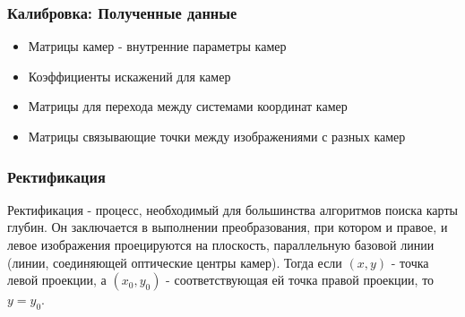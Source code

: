 \documentclass{beamer}
\begin{document}
		\begin{frame}
			\frametitle{Калибровка: Полученные данные}
			
			\begin{itemize}
				\item Матрицы камер - внутренние параметры камер
				\item Коэффициенты искажений для камер
				\item Матрицы для перехода между системами координат камер
				\item Матрицы связывающие точки между изображениями с разных камер
			\end{itemize}
		\end{frame}
		
		\begin{frame}
			\frametitle{Ректификация}
			
			Ректификация - процесс, необходимый для большинства алгоритмов поиска карты
			глубин. Он заключается в выполнении преобразования, при котором и правое, и
			левое изображения проецируются на плоскость, параллельную базовой линии
			(линии, соединяющей оптические центры камер). Тогда если $(x, y)$ - точка
			левой проекции, а $(x_{0},y_{0})$ - соответствующая ей точка правой проекции,
			то $y = y_{0}$.
		\end{frame}
		
\end{document}
